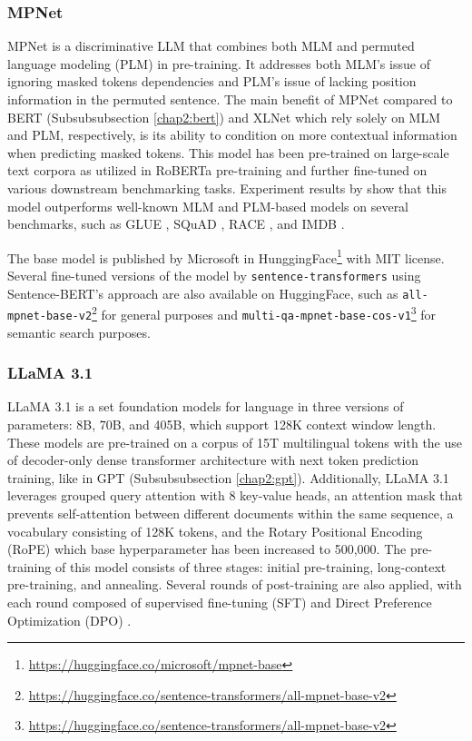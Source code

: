 \subsubsection{MPNet}
MPNet \citep{mpnetsong} is a discriminative LLM that combines both MLM and permuted language modeling (PLM) in pre-training. It addresses both MLM's issue of ignoring masked tokens dependencies and PLM's issue of lacking position information in the permuted sentence. The main benefit of MPNet compared to BERT (Subsubsubsection \ref{chap2:bert}) and XLNet \citep{yang2020xlnetgeneralizedautoregressivepretraining} which rely solely on MLM and PLM, respectively, is its ability to condition on more contextual information when predicting masked tokens. This model has been pre-trained on large-scale text corpora as utilized in RoBERTa \citep{liu2019robertarobustlyoptimizedbert} pre-training and further fine-tuned on various downstream benchmarking tasks. Experiment results by \cite{mpnetsong} show that this model outperforms well-known MLM and PLM-based models on several benchmarks, such as GLUE \citep{wang-etal-2018-glue}, SQuAD \citep{rajpurkar-etal-2016-squad}, RACE \citep{lai-etal-2017-race}, and IMDB \citep{maas-etal-2011-learning}.

The base model is published by Microsoft in HunggingFace\footnote{\url{https://huggingface.co/microsoft/mpnet-base}} with MIT license. Several fine-tuned versions of the model by \texttt{sentence-transformers} using Sentence-BERT's approach \citep{reimers-2019-sentence-bert} are also available on HuggingFace, such as \texttt{all-mpnet-base-v2}\footnote{\url{https://huggingface.co/sentence-transformers/all-mpnet-base-v2}} for general purposes and \texttt{multi-qa-mpnet-base-cos-v1}\footnote{\url{https://huggingface.co/sentence-transformers/all-mpnet-base-v2}} for semantic search purposes.

\subsubsection{LLaMA 3.1}
LLaMA 3.1 \citep{llama3dubey} is a set foundation models for language in three versions of parameters: 8B, 70B, and 405B, which support 128K context window length. These models are pre-trained on a corpus of 15T multilingual tokens with the use of decoder-only dense transformer architecture with next token prediction training, like in GPT (Subsubsubsection \ref{chap2:gpt}). Additionally, LLaMA 3.1 leverages grouped query attention with 8 key-value heads, an attention mask that prevents self-attention between different documents within the same sequence, a vocabulary consisting of 128K tokens, and the Rotary Positional Encoding (RoPE) \citep{su2024} which base hyperparameter has been increased to 500,000. The pre-training of this model consists of three stages: initial pre-training, long-context pre-training, and annealing. Several rounds of post-training are also applied, with each round composed of supervised fine-tuning (SFT) and Direct Preference Optimization (DPO) \citep{rafailov2024}. 

